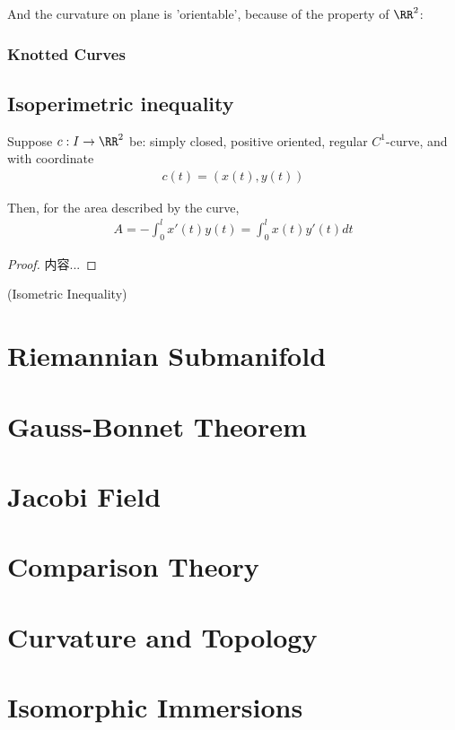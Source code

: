 \documentclass[Total.tex]{subfiles}
\begin{document}
				And the curvature on plane is 'orientable', because of the property of $\RR^2$: 
			\subsection{Knotted Curves}
			
		\section{Isoperimetric inequality}
			\begin{lemma}
				Suppose $c:I\rightarrow \RR^2$ be: simply closed, positive oriented, regular $C^1$-curve, and with coordinate
				\begin{gather*}
					c(t)=(x(t),y(t))
				\end{gather*}
				
				Then, for the area described by the curve, 
				\begin{gather*}
					A=-\int_0^l x'(t)y(t)=\int_0^l x(t)y'(t)dt
				\end{gather*}
			\end{lemma}
			\begin{proof}
				内容...
			\end{proof}
			
			\begin{proposition}
				(Isometric Inequality)
			\end{proposition}
	\chapter{Riemannian Submanifold}
	\chapter{Gauss-Bonnet Theorem}
	\chapter{Jacobi Field}
	\chapter{Comparison Theory}
	\chapter{Curvature and Topology}
	\chapter{Isomorphic Immersions}
\end{document}
